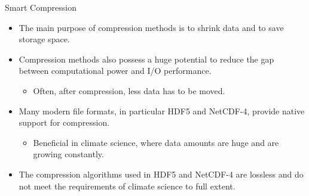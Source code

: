 \documentclass[compress,11pt,xcolor=svgnames,aspectratio=169]{beamer}
\begin{document}
\begin{frame}[fragile]{Smart Compression}

\begin{itemize}
\setlength\itemsep{0.4cm}

\item The main purpose of compression methods is to shrink data and to save storage space.

\item Compression methods also possess a huge potential to reduce the gap between computational power and I/O performance.

  \begin{itemize}
    \item Often, after compression, less data has to be moved.
  \end{itemize}

\item Many modern file formats, in particular HDF5 and NetCDF-4, provide native support for compression.

  \begin{itemize}
    \item Beneficial in climate science, where data amounts are huge and are growing constantly.
  \end{itemize}

\item The compression algorithms used in HDF5 and NetCDF-4 are lossless and do not meet the requirements of climate science to full extent.

\end{itemize}

\end{frame}
\end{document}
